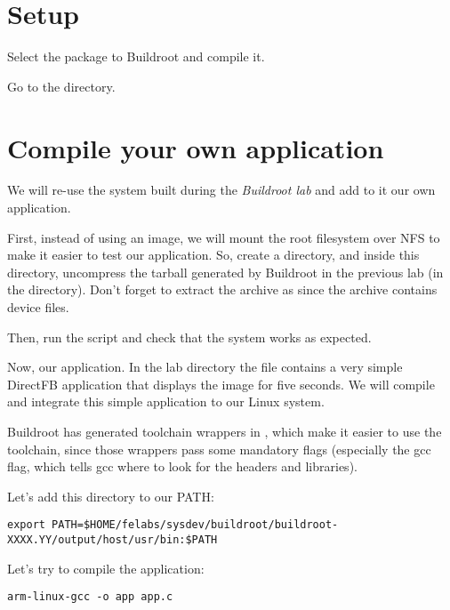 
\section{Setup}

Select the  package to Buildroot and compile it.

Go to the  directory.

\section{Compile your own application}

We will re-use the system built during the {\em Buildroot lab} and add
to it our own application.

First, instead of using an  image, we will mount the root
filesystem over NFS to make it easier to test our application. So,
create a  directory, and inside this directory,
uncompress the tarball generated by Buildroot in the previous lab (in
the  directory). Don't forget to extract the
archive as  since the archive contains device files.

Then, run the  script and check that the system works
as expected.

Now, our application. In the lab directory the file 
contains a very simple DirectFB application that displays the
 image for five seconds. We will compile and
integrate this simple application to our Linux system.

Buildroot has generated toolchain wrappers in
, which make it easier to use the toolchain,
since those wrappers pass some mandatory flags (especially the
 gcc flag, which tells gcc where to look for the
headers and libraries).

Let's add this directory to our PATH:

\footnotesize
\begin{verbatim}
export PATH=$HOME/felabs/sysdev/buildroot/buildroot-XXXX.YY/output/host/usr/bin:$PATH
\end{verbatim}
\normalsize

Let's try to compile the application:

\begin{verbatim}
arm-linux-gcc -o app app.c
\end{verbatim}

